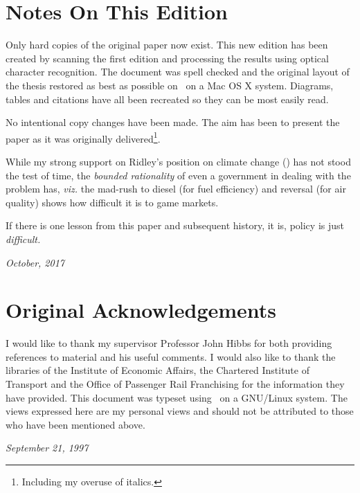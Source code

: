 \thispagestyle{plain}
\section{Notes On This Edition}

Only hard copies of the original paper now exist. This new edition has been created by scanning the first edition and processing the results using optical character recognition. The document was spell checked and the original layout of the thesis restored as best as possible on \XeLaTeX \ on a Mac OS X system. Diagrams, tables and citations have all been recreated so they can be most easily read.

No intentional copy changes have been made. The aim has been to present the paper as it was originally delivered\footnote{Including my overuse of italics.}.

While my strong support on Ridley's position on climate change (\cite{Ridley:1996}) has not stood the test of time, the \textit{bounded rationality} of even a government in dealing with the problem has, \textit{viz.} the mad-rush to diesel (for fuel efficiency) and reversal (for air quality) shows how difficult it is to game markets. 

If there is one lesson from this paper and subsequent history, it is, policy is just \textit{difficult.}

\textit{October, 2017}

\section{Original Acknowledgements}

I would like to thank my supervisor Professor John Hibbs for both providing references to material and his useful comments. I would also like to thank the libraries of the Institute of Economic Affairs, the Chartered Institute of Transport and the Office of Passenger Rail Franchising for the information they have provided. This document was typeset using \LaTeXe  \ on a GNU/Linux system. The views expressed here are my personal views and should not be attributed to those who have been mentioned above.

\textit{September 21, 1997}